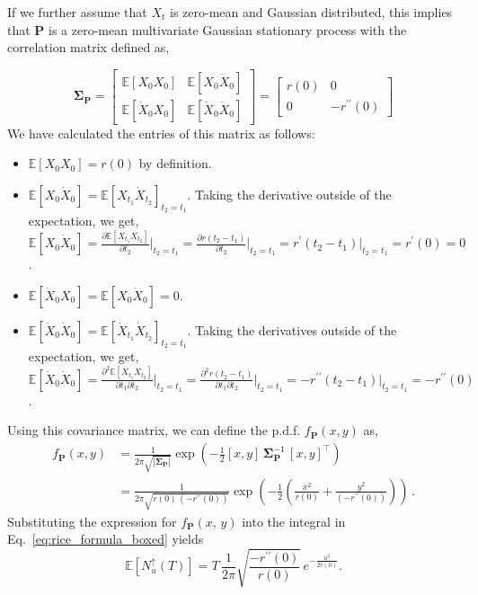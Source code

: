 \documentclass[journal]{IEEEtran}
\theoremstyle{plain}
\theoremstyle{definition}
\theoremstyle{remark}
\newcommand{\E}{\mathbb{E}}
\newcommand{\Nup}{N_u^{\uparrow}(T)}
\newcommand{\rpp}{r^{\prime\prime}}
\begin{document}
If we further assume that $X_{t}$ is zero-mean and Gaussian distributed, this implies that $\mathbf{P}$ is a zero-mean multivariate Gaussian stationary process with the correlation matrix defined as,

\begin{equation}
\renewcommand{\arraystretch}{1.5}
    \boldsymbol{\Sigma}_{\mathbf{P}} = \begin{bmatrix}
                \E[X_{0} X_{0}] & \E[X_{0} \dot{X}_{0}] \\
                \E[\dot{X}_{0} X_{0}] & \E[\dot{X}_{0} \dot{X}_{0}]
                \end{bmatrix} = \begin{bmatrix}
                r(0) & 0 \\
                0 & -\rpp(0)
                \end{bmatrix} 
\end{equation}
We have calculated the entries of this matrix as follows:
\begin{itemize}
    \item $\E\left[X_{0} X_{0}\right] = r(0)$ by definition.
    \item $\E[X_{0} \dot{X}_{0}] = \E[X_{t_1} \dot{X}_{t_2}]_{t_2=t_1}$. Taking the derivative outside of the expectation, we get, \\ $\E[X_{0} \dot{X}_{0}] = \frac{\partial \E[X_{t_1} X_{t_2}]}{\partial t_2}\bigr|_{t_2=t_1} = \frac{\partial r(t_2-t_1)}{\partial t_2}\bigr|_{t_2=t_1} = r^\prime(t_2-t_1)|_{t_2=t_1}=r^\prime(0)=0$.
    \item $\E\left[\dot{X}_{0} X_{0}\right] = \E[X_{0} \dot{X}_{0}] = 0$.
    \item $\E[\dot{X}_{0} \dot{X}_{0}] = \E[\dot{X}_{t_1} \dot{X}_{t_2}]_{t_2=t_1}$. Taking the derivatives outside of the expectation, we get, \\ $\E[\dot{X}_{0} \dot{X}_{0}] = \frac{\partial^2 \E[X_{t_1} X_{t_2}]}{\partial t_1\partial t_2}\bigr|_{t_2=t_1} = \frac{\partial^2 r(t_2-t_1)}{\partial t_1\partial t_2}\bigr|_{t_2=t_1} = -r^{\prime\prime}(t_2-t_1)|_{t_2=t_1} = -r^{\prime\prime}(0)$.
\end{itemize}


Using this covariance matrix, we can define the p.d.f. $f_{\mathbf{P}}(x,y)$ as,
\begin{equation}
\begin{split}
    f_{\mathbf{P}}(x,y) &= \frac{1}{2\pi \sqrt{\left|\boldsymbol{\Sigma}_{\mathbf{P}}\right|}}\exp\left(-\frac{1}{2}[x, y] \, \boldsymbol{\Sigma}_{\mathbf{P}}^{-1} \, [x, y]^\top\right) \\
    &= \frac{1}{2\pi \sqrt{r(0) \, (-\rpp(0))}}\exp\left(-\frac{1}{2}\left(\frac{x^2}{r(0)} + \frac{y^2}{(-\rpp(0))}\right)\right)  \,.
\end{split} 
\end{equation}
Substituting the expression for $f_{\mathbf{P}}(x,\,y)$ into the integral in Eq.~\eqref{eq:rice_formula_boxed} yields
\begin{equation}
    \E\left[\Nup\right] = T \, \frac{1}{2\pi}\sqrt{\frac{-r^{\prime\prime}(0)}{r(0)}} \, e^{-\frac{u^2}{2r(0)}}.
\end{equation}
\end{document}

